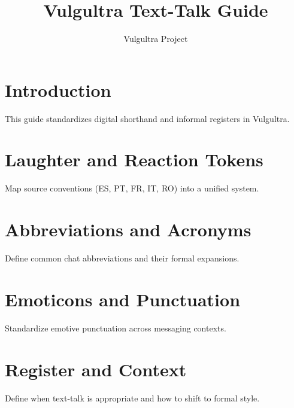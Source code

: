 \documentclass[12pt]{book}
\title{Vulgultra Text-Talk Guide}
\author{Vulgultra Project}
\date{}
\begin{document}
\maketitle
\tableofcontents

\chapter{Introduction}
This guide standardizes digital shorthand and informal registers in Vulgultra.

\chapter{Laughter and Reaction Tokens}
Map source conventions (ES, PT, FR, IT, RO) into a unified system.

\chapter{Abbreviations and Acronyms}
Define common chat abbreviations and their formal expansions.

\chapter{Emoticons and Punctuation}
Standardize emotive punctuation across messaging contexts.

\chapter{Register and Context}
Define when text-talk is appropriate and how to shift to formal style.
\end{document}
